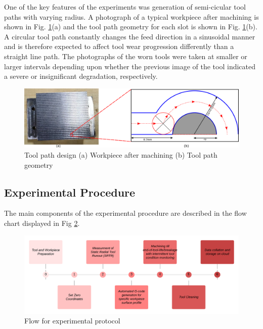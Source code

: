\documentclass[preprint,review,12pt]{elsarticle}
\begin{document}
 One of the key features of the experiments was generation of semi-cicular tool paths with varying radius. A photograph of a typical workpiece after machining is shown in Fig. \ref{fig:fig34}(a) and the tool path geometry for each slot is shown in Fig. \ref{fig:fig34}(b). A circular tool path constantly changes the feed direction in a sinusoidal manner and is therefore expected to affect tool wear progression differently than a straight line path. The photographs of the worn tools were taken at smaller or larger intervals depending upon whether the previous image of the tool indicated a severe or insignificant degradation, respectively. \par

\begin{figure}[!h]
\begin{center}
\includegraphics[width=\linewidth]{34.png}
\caption{Tool path design (a) Workpiece after machining (b) Tool path geometry}\label{fig:fig34}
\end{center}
\end{figure}

\subsection{Experimental Procedure}\label{sec:sec34}
 The main components of the experimental procedure are described in the flow chart displayed in Fig \ref{fig:fig35}. \par

\begin{figure}[!h]
\begin{center}
\includegraphics[width=\linewidth]{35.png}
\caption{Flow for experimental protocol}\label{fig:fig35}
\end{center}
\end{figure}
\end{document}
